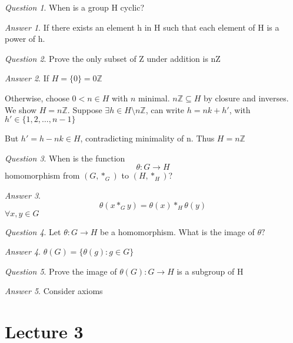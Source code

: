 \documentclass[]{article}
\theoremstyle{remark}
\theoremstyle{qnstyle}
\newtheorem{question}{Question}
\theoremstyle{answerstyle}
\newtheorem*{answer}{Answer}
\begin{document}
\begin{question}
    When is a group H cyclic?
\end{question}
\begin{answer}
    If there exists an element h in H such that each element of H is a power of h. 
\end{answer}

\begin{question}
    Prove the only subset of Z under addition is nZ
\end{question}
\begin{answer}
    If $H = \{0\} = 0\mathbb{Z}$

    Otherwise, choose $0 < n \in H$ with $n$ minimal. $n\mathbb{Z} \subseteq H$ by closure and inverses. We show $H = n\mathbb{Z}$. Suppose $\exists h \in H \setminus n \mathbb{Z}$, can write $h = nk + h'$, with $h' \in \{1,2,\ldots, n-1\}$

    But $h' = h - nk \in H$, contradicting minimality of n. Thus $H = n\mathbb{Z}$
\end{answer}

\begin{question}
    When is the function
        $$\theta: G \to H$$
    homomorphism from $(G, *_G)$ to $(H, *_H)$?
\end{question}
\begin{answer}
    $$\theta(x *_G y) = \theta(x) *_H \theta(y)$$
    $\forall x,y \in G$
\end{answer}

\begin{question}
    Let $\theta: G \to H$ be a homomorphism. What is the image of $\theta?$
\end{question}
\begin{answer}
    $\theta(G) = \{\theta(g) : g \in G\}$
\end{answer}

\begin{question}
    Prove the image of $\theta(G): G \to H$ is a subgroup of H
\end{question}
\begin{answer}
    Consider axioms
\end{answer}







\section* {Lecture 3}
\end{document}
